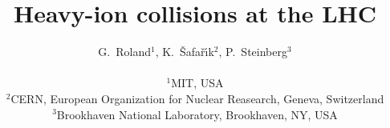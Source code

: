 \documentclass[twoside,12pt]{article}
\begin{document}
\linenumbers

\title{ \vspace{1cm} Heavy-ion collisions at the LHC}
\author{G.\ Roland$^{1}$, K.\ \v{S}afa\v{r}\'{\i}k$^2$, P.\ Steinberg$^3$\\
\\
$^1$MIT, USA\\
$^2$CERN, European Organization for Nuclear Reasearch, Geneva, Switzerland\\
$^3$Brookhaven National Laboratory, Brookhaven, NY, USA\\
}
\maketitle














\end{document}

